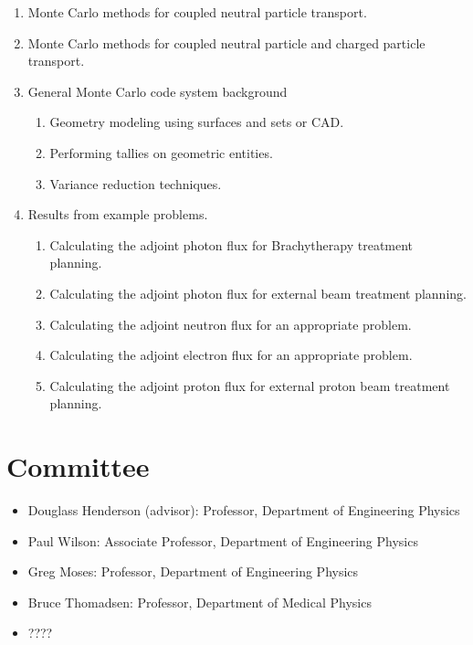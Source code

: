 \documentclass[letterpaper,12pt]{article}
\begin{document}
\begin{enumerate}
    \item Monte Carlo methods for coupled neutral particle transport.
    \item Monte Carlo methods for coupled neutral particle and charged particle transport.
    \item General Monte Carlo code system background
      \begin{enumerate}
        \item Geometry modeling using surfaces and sets or CAD.
        \item Performing tallies on geometric entities.
        \item Variance reduction techniques.
      \end{enumerate}
      
    \item Results from example problems.
      \begin{enumerate}
        \item Calculating the adjoint photon flux for Brachytherapy treatment planning.
        \item Calculating the adjoint photon flux for external beam treatment planning.
        \item Calculating the adjoint neutron flux for an appropriate problem.
        \item Calculating the adjoint electron flux for an appropriate problem.
        \item Calculating the adjoint proton flux for external proton beam treatment planning.
      \end{enumerate}
\end{enumerate}

\section{Committee}
\begin{itemize}
  \item Douglass Henderson (advisor): Professor, Department of Engineering Physics
  \item Paul Wilson: Associate Professor, Department of Engineering Physics
  \item Greg Moses: Professor, Department of Engineering Physics
  \item Bruce Thomadsen: Professor, Department of Medical Physics
  \item ????
\end{itemize}        

\pagebreak


\end{document}
